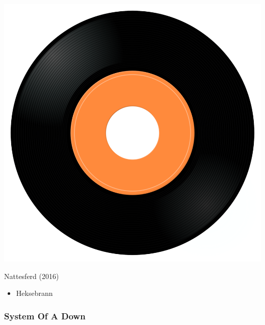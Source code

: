 \begin{minipage}[t]{0.25\textwidth}\vspace{0pt}
\captionsetup{type=figure}
\includegraphics[width=\textwidth]{Images/cover.png}
\caption*{Nattesferd (2016)}
\end{minipage}
\begin{minipage}[t]{0.25\textwidth}\vspace{0pt}
\begin{itemize}[nosep,leftmargin=1em,labelwidth=*,align=left]
	\setlength{\itemsep}{0pt}
	\item Heksebrann
\end{itemize}
\end{minipage}

\subsubsection{System Of A Down}

